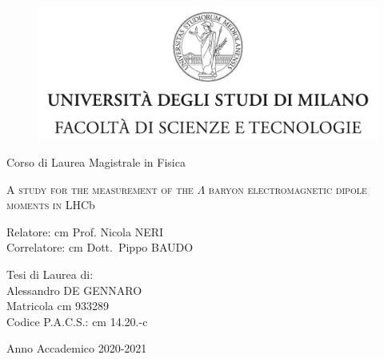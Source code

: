 

\begin{titlepage}
	\begin{figure}[t]
		\centering
		\includegraphics[width=390pt]{graphics/cover-page/logo.jpg}
		\centering
	\end{figure}	
\begin{center}
{\large Corso di Laurea Magistrale in Fisica}
\end{center}

\begin{center}
\vspace{2 cm}
{\Large \textsc{A study for the measurement of the $\Lambda$ baryon electromagnetic
dipole moments in LHC}b\par}
\end{center}
  \vspace{2 cm}
  
  \begin{flushleft}
  		 Relatore:  cm Prof. Nicola NERI\\
		 
  		 \noindent Correlatore:  cm Dott.\ Pippo BAUDO
  \end{flushleft}
  \vspace{1 cm}
  \begin{flushright}
  	Tesi di Laurea di:\\ Alessandro DE GENNARO\\ Matricola  cm 933289\\ Codice P.A.C.S.:  cm 14.20.-c
  \end{flushright}
    	  
\begin{center}
\vspace{2 cm}
{\large Anno Accademico 2020-2021}
\end{center}
\end{titlepage}